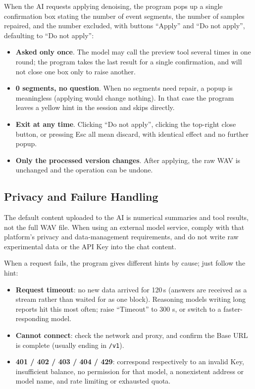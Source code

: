 \documentclass[UTF8,a4paper,12pt]{ctexart}
\begin{document}
When the AI requests applying denoising, the program pops up a single confirmation box stating the number of event segments, the number of samples repaired, and the number excluded, with buttons ``Apply'' and ``Do not apply'', defaulting to ``Do not apply'':

\begin{itemize}
  \item \textbf{Asked only once}. The model may call the preview tool several times in one round; the program takes the last result for a single confirmation, and will not close one box only to raise another.
  \item \textbf{0 segments, no question}. When no segments need repair, a popup is meaningless (applying would change nothing). In that case the program leaves a yellow hint in the session and skips directly.
  \item \textbf{Exit at any time}. Clicking ``Do not apply'', clicking the top-right close button, or pressing Esc all mean discard, with identical effect and no further popup.
  \item \textbf{Only the processed version changes}. After applying, the raw WAV is unchanged and the operation can be undone.
\end{itemize}

\subsection{Privacy and Failure Handling}

The default content uploaded to the AI is numerical summaries and tool results, not the full WAV file. When using an external model service, comply with that platform's privacy and data-management requirements, and do not write raw experimental data or the API Key into the chat content.

When a request fails, the program gives different hints by cause; just follow the hint:

\begin{itemize}
  \item \textbf{Request timeout}: no new data arrived for 120\,s (answers are received as a stream rather than waited for as one block). Reasoning models writing long reports hit this most often; raise ``Timeout'' to 300 s, or switch to a faster-responding model.
  \item \textbf{Cannot connect}: check the network and proxy, and confirm the Base URL is complete (usually ending in \texttt{/v1}).
  \item \textbf{401 / 402 / 403 / 404 / 429}: correspond respectively to an invalid Key, insufficient balance, no permission for that model, a nonexistent address or model name, and rate limiting or exhausted quota.
\end{itemize}
\end{document}
